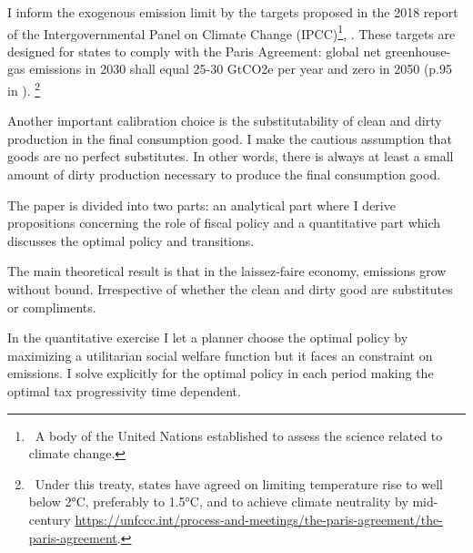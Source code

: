 I inform the exogenous emission limit by the  targets proposed in the 2018 report of the Intergovernmental Panel on Climate Change (IPCC)\footnote{\ A body of the United Nations established to assess the science related to climate change.},  \cite{Rogelj2018MitigationDevelopment.}. These targets are designed for states to comply with the Paris Agreement: global net greenhouse-gas emissions in 2030 shall equal 25-30 GtCO2e per year and zero in 2050 (p.95 in \cite{Rogelj2018MitigationDevelopment.}).%
\footnote{\ Under this treaty, states have agreed on limiting temperature rise to well below 2°C, preferably to 1.5°C, and to achieve climate neutrality by mid-century \url{https://unfccc.int/process-and-meetings/the-paris-agreement/the-paris-agreement}. }

Another important calibration choice is the substitutability of clean and dirty production in the final consumption good. I make the cautious assumption that goods are no perfect substitutes. In other words, there is always at least a small amount of dirty production necessary to produce the final consumption good. 

The paper is divided into two parts: an analytical part where I derive propositions concerning the role of fiscal policy and a quantitative part which discusses the optimal policy and transitions. 

The main theoretical result is that in the laissez-faire economy, emissions grow without bound. Irrespective of whether the clean and dirty good are substitutes or compliments.

In the quantitative exercise I let a planner choose the optimal policy by maximizing a utilitarian social welfare function but it faces an constraint on emissions. I solve explicitly for the optimal policy in each period making the optimal tax progressivity time dependent. 


